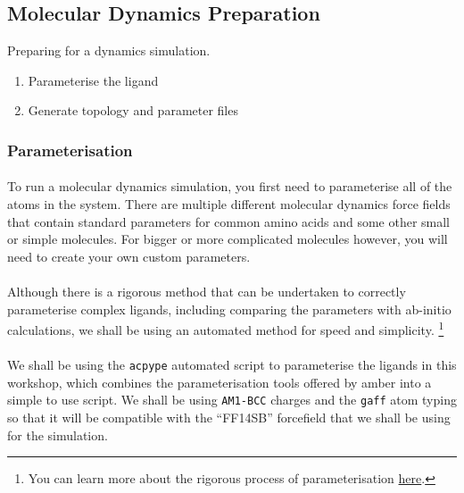 \subsection{Molecular Dynamics Preparation}
    \begin{task}[label=task:Prep]{Preparing for a dynamics simulation.}
        \begin{enumerate}[label=(\alph*)]
            \item Parameterise the ligand
            \item Generate topology and parameter files
        \end{enumerate}
    \end{task}

\subsubsection{Parameterisation}
    \paragraph{}
        To run a molecular dynamics simulation, you first need to parameterise all of the atoms in the system. There are multiple different molecular dynamics force fields that contain standard parameters for common amino acids and some other small or simple molecules. For bigger or more complicated molecules however, you will need to create your own custom parameters. 

    \paragraph{}
        Although there is a rigorous method that can be undertaken to correctly parameterise complex ligands, including comparing the parameters with ab-initio calculations, we shall be using an automated method for speed and simplicity. \footnote{You can learn more about the rigorous process of parameterisation \href{http://ambermd.org/tutorials/basic/tutorial4b/}{here}.}

    \paragraph{}
        We shall be using the \texttt{acpype}\cite{SousadaSilva2012ACPYPEInterfacE} automated script to parameterise the ligands in this workshop, which combines the parameterisation tools offered by amber into a simple to use script. We shall be using \texttt{AM1-BCC}\cite{Jakalian2002FastValidation} charges and the \texttt{gaff}\cite{Wang2004DevelopmentField} atom typing so that it will be compatible with the \enquote{FF14SB} forcefield\cite{Maier2015Ff14SB:Ff99SB} that we shall be using for the simulation. 


